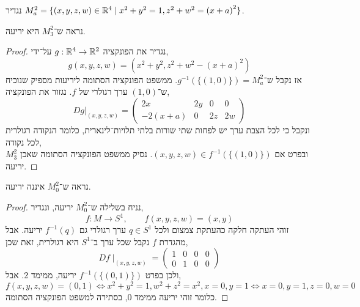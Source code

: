 \question[4]
נגדיר $M_a^2 = \{ (x, y, z, w) \in \mathbb{R}^4 \mid x^2 + y^2 = 1, z^2 + w^2 = {(x + a)}^2 \}$.

\subquestion{}
נראה ש־$M_3^2$ היא יריעה.
\begin{proof}
	נגדיר את הפונקציה $g : \mathbb{R}^4 \to \mathbb{R}^2$ על־ידי,
	\[
		g(x, y, z, w)
		= (x^2 + y^2, z^2 + w^2 - {(x + a)}^2)
	\]
	אז נקבל ש־$g^{-1}(\{ (1, 0) \}) = M_a^2$.
	ממשפט הפונקציה הסתומה ליריעות מספיק שנוכיח ש־$(1, 0)$ ערך רגולרי של $f$.
	נגזור את הפונקציה,
	\[
		D g |_{(x, y, z, w)}
		= \begin{pmatrix}
			2x & 2y & 0 & 0 \\
			-2(x + a) & 0 & 2z & 2w
		\end{pmatrix}
	\]
	ונקבל כי לכל הצבת ערך יש לפחות שתי שורות בלתי תלויות־לינארית, כלומר הנקודה רגולרית לכל נקודה, \\
	ובפרט אם $(x, y, z, w) \in f^{-1}(\{ (1, 0) \})$.
	נסיק ממשפט הפונקציה הסתומה שאכן $M_3^2$ יריעה.
\end{proof}

\subquestion{}
נראה ש־$M_0^2$ איננה יריעה.
\begin{proof}
	נניח בשלילה ש־$M_0^2$ יריעה, ונגדיר,
	\[
		f : M \to S^1,
		\qquad
		f(x, y, z, w) = (x, y)
	\]
	זוהי העתקה חלקה כהעתקת צמצום ולכל $q \in S^1$ ערך רגולרי גם $f^{-1}(q)$ יריעה.
	אבל מהגדרת $f$ נקבל שכל ערך ב־$S^1$ היא רגולרית, זאת שכן,
	\[
		D f \mid_{(x, y, z, w)}
		= \begin{pmatrix}
			1 & 0 & 0 & 0 \\
			0 & 1 & 0 & 0
		\end{pmatrix} 
	\]
	ולכן בפרט $f^{-1}(\{(0, 1)\})$ יריעה, ממימד 2.
	אבל,
	\[
		f(x, y, z, w) = (0, 1)
		\iff x^2 + y^2 = 1, w^2 + z^2 = x^2, x = 0, y = 1
		\iff x = 0, y = 1, z = 0, w = 0
	\]
	כלומר זוהי יריעה ממימד 0, בסתירה למשפט הפונקציה הסתומה.
\end{proof}

